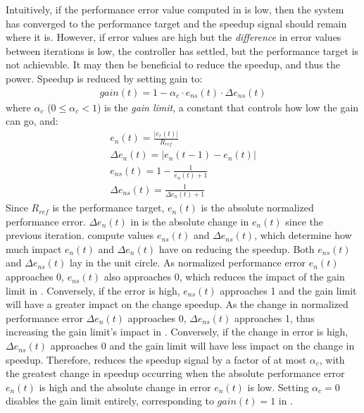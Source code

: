 Intuitively, if the performance error value computed in  is low, then the system has converged to the performance target and the speedup signal should remain where it is.
However, if error values are high but the \emph{difference} in error values between iterations is low, the controller has settled, but the performance target is not achievable.
It may then be beneficial to reduce the speedup, and thus the power.
Speedup is reduced by setting gain to:
\begin{eqnarray}
  gain(t) = 1 - \alpha_c \cdot e_{ns}(t) \cdot \Delta e_{ns}(t)
  \label{eqn:cost-pole}
\end{eqnarray}
where $\alpha_c$ ($0 \le \alpha_c < 1$) is the \emph{gain limit}, a constant that controls how low the gain can go, and:
\begin{eqnarray}
  e_n(t) = \frac{|e_r(t)|}{R_{ref}}
  \label{eqn:en} \\
  \Delta e_n(t) = \left| e_n(t-1) - e_n(t) \right|
  \label{eqn:den} \\
  e_{ns}(t) = 1 - \frac{1}{e_{n}(t)+1}
  \label{eqn:ens} \\
  \Delta e_{ns}(t) = \frac{1}{\Delta e_{n}(t)+1}
  \label{eqn:dens}
\end{eqnarray}
Since $R_{ref}$ is the performance target, $e_n(t)$ is the absolute normalized performance error.
$\Delta e_n(t)$ in  is the absolute change in $e_n(t)$ since the previous iteration.
 compute values $e_{ns}(t)$ and $\Delta e_{ns}(t)$, which determine how much impact $e_n(t)$ and $\Delta e_{n}(t)$ have on reducing the speedup.
Both $e_{ns}(t)$ and $\Delta e_{ns}(t)$ lay in the unit circle.
As normalized performance error $e_n(t)$ approaches 0, $e_{ns}(t)$ also approaches 0, which reduces the impact of the gain limit in .
Conversely, if the error is high, $e_{ns}(t)$ approaches 1 and the gain limit will have a greater impact on the change speedup.
As the change in normalized performance error $\Delta e_{n}(t)$ approaches 0, $\Delta e_{ns}(t)$ approaches 1, thus increasing the gain limit's impact in .
Conversely, if the change in error is high, $\Delta e_{ns}(t)$ approaches 0 and the gain limit will have less impact on the change in speedup.
Therefore,  reduces the speedup signal by a factor of at most $\alpha_c$, with the greatest change in speedup occurring when the absolute performance error $e_n(t)$ is high and the absolute change in error $e_n(t)$ is low.
Setting $\alpha_c=0$ disables the gain limit entirely, corresponding to $gain(t) =1 $ in .

